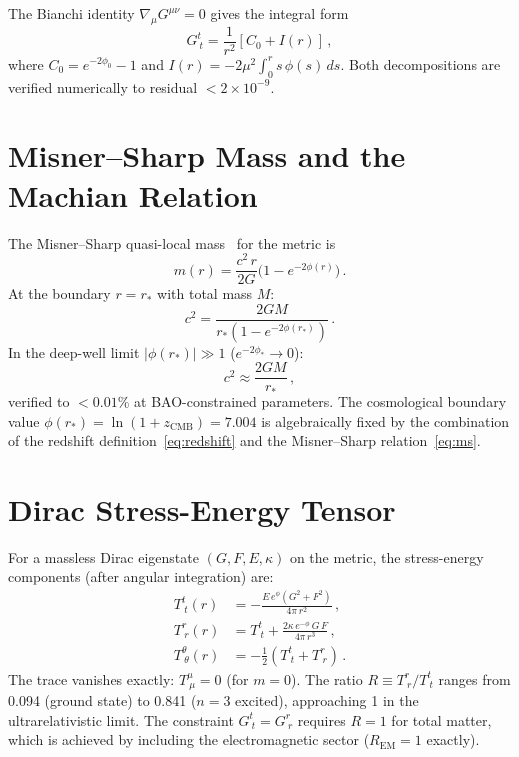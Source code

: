 \documentclass[aps,prd,twocolumn,superscriptaddress,nofootinbib,longbibliography]{revtex4-2}
\newcommand{\rstar}{r_{*}}
\newcommand{\phiz}{\phi_0}
\begin{document}
The Bianchi identity $\nabla_\mu G^{\mu\nu} = 0$ gives the integral
form
\begin{equation}
  G^t_{\ t} = \frac{1}{r^2}\left[C_0 + I(r)\right]\,,
\end{equation}
where $C_0 = e^{-2\phiz} - 1$ and
$I(r) = -2\mu^2\int_0^r s\,\phi(s)\,ds$.  Both decompositions are
verified numerically to residual $< 2 \times 10^{-9}$.

\section{Misner--Sharp Mass and the Machian Relation}%
\label{app:misner}

The Misner--Sharp quasi-local mass~\cite{MisnerSharp1964} for the metric is
\begin{equation}\label{eq:ms}
  m(r) = \frac{c^2\,r}{2G}\bigl(1 - e^{-2\phi(r)}\bigr)\,.
\end{equation}
At the boundary $r = \rstar$ with total mass $M$:
\begin{equation}
  c^2 = \frac{2GM}{\rstar(1 - e^{-2\phi(\rstar)})}\,.
\end{equation}
In the deep-well limit $|\phi(\rstar)| \gg 1$
($e^{-2\phi_*} \to 0$):
\begin{equation}\label{eq:machian-app}
  c^2 \approx \frac{2GM}{\rstar}\,,
\end{equation}
verified to $< 0.01\%$ at BAO-constrained parameters.  The cosmological
boundary value
$\phi(\rstar) = \ln(1 + z_{\mathrm{CMB}}) = 7.004$ is algebraically
fixed by the combination of the redshift definition~\eqref{eq:redshift}
and the Misner--Sharp relation~\eqref{eq:ms}.

\section{Dirac Stress-Energy Tensor}\label{app:tmunu}

For a massless Dirac eigenstate $(G, F, E, \kappa)$ on the metric,
the stress-energy components (after angular integration) are:
\begin{align}
  T^t_{\ t}(r) &= -\frac{E\,e^{\phi}(G^2 + F^2)}{4\pi\,r^2}\,,
    \label{eq:Ttt}\\
  T^r_{\ r}(r) &= T^t_{\ t}
    + \frac{2\kappa\,e^{-\phi}\,G\,F}{4\pi\,r^3}\,,
    \label{eq:Trr}\\
  T^\theta_{\ \theta}(r) &= -\frac{1}{2}(T^t_{\ t} + T^r_{\ r})\,.
    \label{eq:Tthth}
\end{align}
The trace vanishes exactly: $T^\mu_{\ \mu} = 0$ (for $m = 0$).  The
ratio $R \equiv T^r_{\ r}/T^t_{\ t}$ ranges from 0.094 (ground state)
to 0.841 ($n = 3$ excited), approaching 1 in the ultrarelativistic
limit.  The constraint $G^t_{\ t} = G^r_{\ r}$ requires $R = 1$ for
total matter, which is achieved by including the electromagnetic
sector ($R_{\mathrm{EM}} = 1$ exactly).
\end{document}
